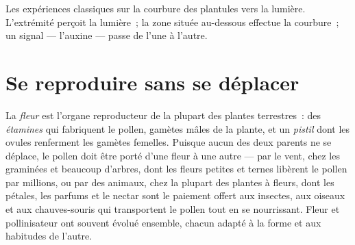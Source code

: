 \begin{omfigure}

{\small Les expériences classiques sur la courbure des plantules vers
la lumière. L'extrémité perçoit la lumière~; la zone située au-dessous
effectue la courbure~; un signal --- l'auxine --- passe de l'une à
l'autre.}
\end{omfigure}

\section{Se reproduire sans se déplacer}

\begin{proposition}\label{prop:g12:plant-rooted-life:flowers}
La \emph{fleur} est l'organe reproducteur de la plupart des plantes
terrestres~: des \emph{étamines} qui fabriquent le pollen, gamètes
mâles de la plante, et un \emph{pistil} dont les ovules renferment les
gamètes femelles. Puisque aucun des deux parents ne se déplace, le
pollen doit être porté d'une fleur à une autre --- par le vent, chez
les graminées et beaucoup d'arbres, dont les fleurs petites et ternes
libèrent le pollen par millions, ou par des animaux, chez la plupart
des plantes à fleurs, dont les pétales, les parfums et le nectar sont
le paiement offert aux insectes, aux oiseaux et aux chauves-souris qui
transportent le pollen tout en se nourrissant. Fleur et pollinisateur
ont souvent évolué ensemble, chacun adapté à la forme et aux habitudes
de l'autre.
\end{proposition}
\admitted

